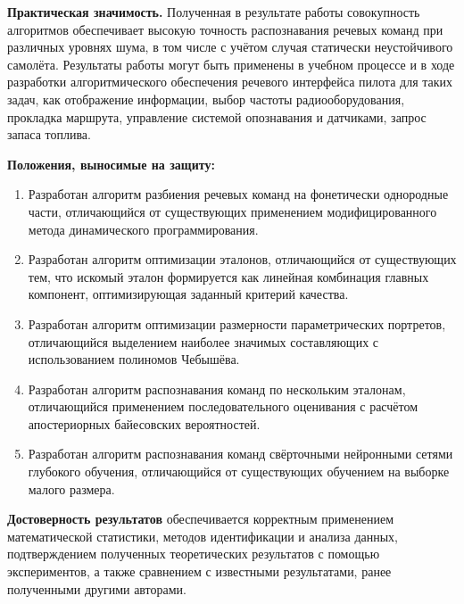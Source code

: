 \textbf{Практическая значимость.}
Полученная в результате работы совокупность алгоритмов обеспечивает высокую точность распознавания речевых команд при различных уровнях шума, в том числе с учётом случая статически неустойчивого самолёта.
Результаты работы могут быть применены в учебном процессе и в ходе разработки алгоритмического обеспечения речевого интерфейса пилота для таких задач, как отображение информации, выбор частоты радиооборудования, прокладка маршрута, управление системой опознавания и датчиками, запрос запаса топлива.

\textbf{Положения, выносимые на защиту:}
\begin{enumerate}[label={\arabic*)}]
	\item Разработан алгоритм разбиения речевых команд на фонетически однородные части, отличающийся от существующих применением модифицированного метода динамического программирования.
	\item Разработан алгоритм оптимизации эталонов, отличающийся от существующих тем, что искомый эталон формируется как линейная комбинация главных компонент, оптимизирующая заданный критерий качества.
	\item Разработан алгоритм оптимизации размерности параметрических портретов, отличающийся выделением наиболее значимых составляющих с использованием полиномов Чебышёва.
	\item Разработан алгоритм распознавания команд по нескольким эталонам, отличающийся применением последовательного оценивания с расчётом апостериорных байесовских вероятностей.
	\item Разработан алгоритм распознавания команд свёрточными нейронными сетями глубокого обучения, отличающийся от существующих обучением на выборке малого размера.
\end{enumerate}

\textbf{Достоверность результатов} обеспечивается корректным применением математической статистики, методов идентификации и анализа данных, подтверждением полученных теоретических результатов с помощью экспериментов, а также сравнением с известными результатами, ранее полученными другими авторами.

